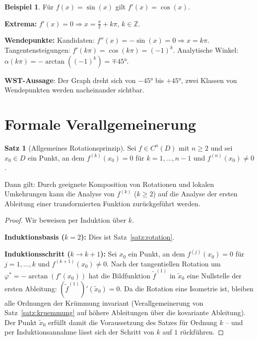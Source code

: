 ﻿\documentclass[12pt, a4paper]{article}
\theoremstyle{definition}
\newtheorem{satz}{Satz}[section]
\newtheorem{beispiel}{Beispiel}[section]
\begin{document}
	\begin{beispiel}
		Für $f(x) = \sin(x)$ gilt $f'(x) = \cos(x)$.
		
		\textbf{Extrema:} $f'(x) = 0 \Rightarrow x = \frac{\pi}{2} + k\pi$, $k \in \mathbb{Z}$.
		
		\textbf{Wendepunkte:} Kandidaten: $f''(x) = -\sin(x) = 0 \Rightarrow x = k\pi$.
		Tangentensteigungen: $f'(k\pi) = \cos(k\pi) = (-1)^k$.
		Analytische Winkel: $\alpha(k\pi) = -\arctan((-1)^k) = \mp 45 °$.
		
		\textbf{WST-Aussage}: Der Graph dreht sich von $-45 °$ bis $+45 °$, zwei Klassen
		von Wendepunkten werden nacheinander sichtbar.
	\end{beispiel}
	
	\section{Formale Verallgemeinerung}
	
	\begin{satz}[Allgemeines Rotationsprinzip]\label{satz:allgemein}
		Sei $f \in C^n(D)$ mit $n \geq 2$ und sei $x_0 \in D$ ein Punkt, an dem
		$f^{(k)}(x_0) = 0$ für $k = 1, \ldots, n-1$ und $f^{(n)}(x_0) \neq 0$.
		
		Dann gilt: Durch geeignete Komposition von Rotationen und lokalen
		Umkehrungen kann die Analyse von $f^{(k)}$ ($k \geq 2$) auf die Analyse
		der ersten Ableitung einer transformierten Funktion zurückgeführt werden.
	\end{satz}
	
	\begin{proof}
		Wir beweisen per Induktion über $k$.
		
		\textbf{Induktionsbasis ($k = 2$):} Dies ist Satz~\ref{satz:rotation}.
		
		\textbf{Induktionsschritt ($k \to k+1$):} Sei $x_0$ ein Punkt, an dem
		$f^{(j)}(x_0) = 0$ für $j = 1, \ldots, k$ und $f^{(k+1)}(x_0) \neq 0$.
		Nach der tangentiellen Rotation um $\varphi^* = -\arctan(f'(x_0))$ hat die
		Bildfunktion $\tilde{f}^{(1)}$ in $\tilde{x}_0$ eine Nullstelle der
		ersten Ableitung: $(\tilde{f}^{(1)})'(\tilde{x}_0) = 0$.
		Da die Rotation eine Isometrie ist, bleiben alle Ordnungen der Krümmung
		invariant (Verallgemeinerung von Satz~\ref{satz:kruemmung} auf höhere Ableitungen
		über die kovariante Ableitung). Der Punkt $\tilde{x}_0$ erfüllt damit die
		Voraussetzung des Satzes für Ordnung $k$ -- und per Induktionsannahme
		lässt sich der Schritt von $k$ auf $1$ rückführen.
	\end{proof}
	
\end{document}
